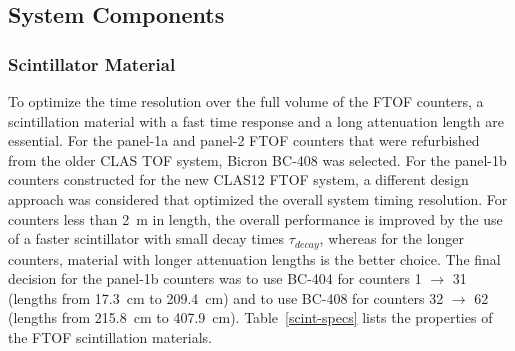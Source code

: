 \documentclass{elsart}
\begin{document}
\subsection{System Components}

\subsubsection{Scintillator Material}

To optimize the time resolution over the full volume of the FTOF counters, a scintillation material with a
fast time response and a long attenuation length are essential. For the panel-1a and panel-2 FTOF counters
that were refurbished from the older CLAS TOF system, Bicron BC-408 was selected. For the panel-1b
counters constructed for the new CLAS12 FTOF system, a different design approach was considered
that optimized the overall system timing resolution. For counters less than 2~m in length, the overall
performance is improved by the use of a faster scintillator with small decay times $\tau_{decay}$, whereas
for the longer counters, material with longer attenuation lengths is the better choice. The final decision
for the panel-1b counters was to use BC-404 for counters 1 $\to$ 31 (lengths from 17.3~cm to 209.4~cm)
and to use BC-408 for counters 32 $\to$ 62 (lengths from 215.8~cm to 407.9~cm). Table~\ref{scint-specs}
lists the properties of the FTOF scintillation materials.
\end{document}
